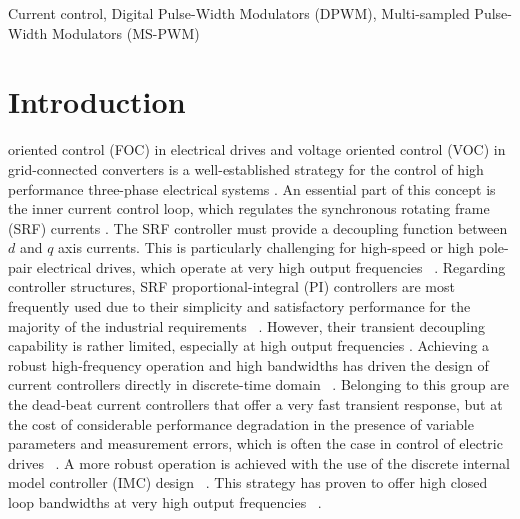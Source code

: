 \documentclass[conference]{IEEEtran}
\begin{document}
\begin{IEEEkeywords}
Current control, Digital Pulse-Width Modulators (DPWM), Multi-sampled Pulse-Width Modulators (MS-PWM)
\end{IEEEkeywords}


\IEEEpeerreviewmaketitle

\section{Introduction}
 oriented control (FOC) in electrical drives and voltage oriented control (VOC) in grid-connected converters is a well-established strategy for the control of high performance three-phase electrical systems \cite{holmes2012}. An essential part of this concept is the inner current control loop, which regulates the synchronous rotating frame (SRF) currents \cite{holmes2012}. The SRF controller must provide a decoupling function between $d$ and $q$ axis currents. This is particularly challenging for high-speed or high pole-pair electrical drives, which operate at very high output frequencies ~\cite{yim2009,Petric2021a}. 
Regarding controller structures, SRF proportional-integral (PI) controllers are most frequently used due to their simplicity and satisfactory performance for the majority of the industrial requirements ~\cite{yim2009,yepes2014}. However, their transient decoupling capability is rather limited, especially at high output frequencies \cite{lorenz2010}. Achieving a robust high-frequency operation and high bandwidths has driven the design of current controllers directly in discrete-time domain ~\cite{lorenz2010,vuksa2016,commentsHoffmann}. Belonging to this group are the dead-beat current controllers that offer a very fast transient response, but at the cost of considerable performance degradation in the presence of variable parameters and measurement errors, which is often the case in control of electric drives ~\cite{rovere2018,xu2019,Ito2021}. A more robust operation is achieved with the use of the discrete internal model controller (IMC) design ~\cite{lorenz2010,vuksa2016,commentsHoffmann}. This strategy has proven to offer high closed loop bandwidths at very high output frequencies ~\cite{commentsHoffmann,vuksa2016,Petric2021a}.
\end{document}
